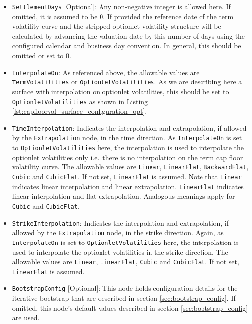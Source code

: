 \begin{itemize}
\item \lstinline!SettlementDays! [Optional]:
Any non-negative integer is allowed here. If omitted, it is assumed to be 0. If provided the reference date of the term volatility curve and the stripped optionlet volatility structure will be calculated by advancing the valuation date by this number of days using the configured calendar and business day convention. In general, this should be omitted or set to 0.

\item \lstinline!InterpolateOn!:
As referenced above, the allowable values are \lstinline!TermVolatilities! or \lstinline!OptionletVolatilities!. As we are describing here a surface with interpolation on optionlet volatilities, this should be set to \lstinline!OptionletVolatilities! as shown in Listing \ref{lst:capfloorvol_surface_configuration_opt}.

\item \lstinline!TimeInterpolation!:
Indicates the interpolation and extrapolation, if allowed by the \lstinline!Extrapolation! node, in the time direction. As \lstinline!InterpolateOn! is set to \lstinline!OptionletVolatilities! here, the interpolation is used to interpolate the optionlet volatilities only i.e.\ there is no interpolation on the term cap floor volatility curve. The allowable values are \lstinline!Linear!, \lstinline!LinearFlat!, \lstinline!BackwardFlat!, \lstinline!Cubic! and \lstinline!CubicFlat!. If not set, \lstinline!LinearFlat! is assumed. Note that \lstinline!Linear! indicates linear interpolation and linear extrapolation. \lstinline!LinearFlat! indicates linear interpolation and flat extrapolation. Analogous meanings apply for \lstinline!Cubic! and \lstinline!CubicFlat!.

\item \lstinline!StrikeInterpolation!:
Indicates the interpolation and extrapolation, if allowed by the \lstinline!Extrapolation! node, in the strike direction. Again, as \lstinline!InterpolateOn! is set to \lstinline!OptionletVolatilities! here, the interpolation is used to interpolate the optionlet volatilities in the strike direction. The allowable values are \lstinline!Linear!, \lstinline!LinearFlat!, \lstinline!Cubic! and \lstinline!CubicFlat!. If not set, \lstinline!LinearFlat! is assumed.

\item \lstinline!BootstrapConfig! [Optional]:
This node holds configuration details for the iterative bootstrap that are described in section \ref{sec:bootstrap_config}. If omitted, this node's default values described in section \ref{sec:bootstrap_config} are used.

\end{itemize}

